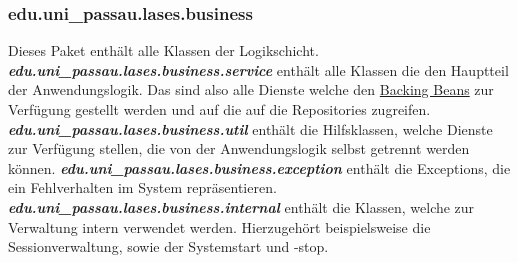 \subsubsection{edu.uni\_passau.lases.business}
Dieses Paket enthält alle Klassen der Logikschicht.
\newline\newline
\textbf{\emph{edu.uni\_passau.lases.business.service}}
enthält alle Klassen die den Hauptteil der Anwendungslogik.
Das sind also alle Dienste welche den
\hyperref[arch:backing]{Backing Beans} zur Verfügung
gestellt werden und auf die auf die %
Repositories zugreifen.
\newline\newline
\textbf{\emph{edu.uni\_passau.lases.business.util}}
enthält die Hilfsklassen, welche Dienste zur Verfügung stellen,
die von der Anwendungslogik selbst getrennt werden können.
\newline\newline
\textbf{\emph{edu.uni\_passau.lases.business.exception}}
enthält die Exceptions, die ein Fehlverhalten im System repräsentieren.
\newline\newline
\textbf{\emph{edu.uni\_passau.lases.business.internal}}
enthält die Klassen, welche zur Verwaltung intern verwendet werden.
Hierzugehört beispielsweise die Sessionverwaltung, sowie der Systemstart und -stop.

